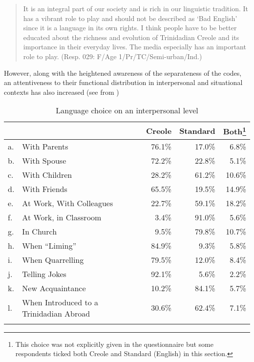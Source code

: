 \documentclass[output=paper,colorlinks,citecolor=brown]{langscibook}
\begin{document}
\begin{quote}
  It is an integral part of our society and is rich in our linguistic tradition. It has a vibrant role to play and should not be described as `Bad English' since it is a language in its own rights. I think people have to be better educated about the richness and evolution of Trinidadian Creole and its importance in their everyday lives. The media especially has an important role to play. (Resp. 029: F/Age 1/Pr/TC/Semi-urban/Ind.) \citep[74]{mühleisen2001bad}
\end{quote}

However, along with the heightened awareness of the separateness of the codes, an attentiveness to their functional distribution in interpersonal and situational contexts has also increased (see  from \citealt[66]{mühleisen2001bad})

\begin{table}
\begin{tabular}{l@{ }lrrr}
\lsptoprule
&& Creole  &  Standard & Both\footnote{This choice was not explicitly given in the questionnaire but some respondents ticked both Creole and Standard (English) in this section.}\\
\midrule
a. & {With Parents} & 76.1\% & 17.0\% & 6.8\%   \\
b. & {With Spouse} & 72.2\% &22.8\% & 5.1\%\\
c. & {With Children} & 28.2\% & 61.2\%  & 10.6\% \\
d. & {With Friends} & 65.5\% & 19.5\% &14.9\%\\
e. & {At Work, With Colleagues} & 22.7\% &  59.1\% & 18.2\% \\
f. & {At Work, in Classroom}& 3.4\% & 91.0\% & 5.6\%\\
g. & {In Church} & 9.5\% & 79.8\% & 10.7\% \\
h. & {When ``Liming''} & 84.9\% & 9.3\% & 5.8\% \\
i. & {When Quarrelling} & 79.5\% & 12.0\% & 8.4\%\\
j. & {Telling Jokes} & 92.1\% & 5.6\% & 2.2\%\\
k. &  {New Acquaintance} & 10.2\% & 84.1\% & 5.7\% \\
l. & {When Introduced to a Trinidadian Abroad} & 30.6\% & 62.4\% & 7.1\%\\
\lspbottomrule
\end{tabular}
\caption{Language choice on an interpersonal level\label{tab:muhleisen:1}}
\end{table}
\end{document}
